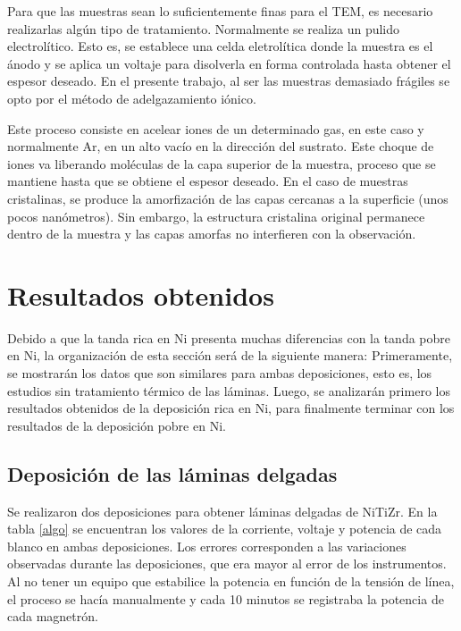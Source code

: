 \documentclass{article}
\theoremstyle{definition}
\theoremstyle{remark}
\begin{document}
Para que las muestras sean lo suficientemente finas para el TEM, es necesario realizarlas algún tipo de tratamiento. Normalmente se realiza un pulido electrolítico. Esto es, se establece una celda eletrolítica donde la muestra es el ánodo y se aplica un voltaje para disolverla en forma controlada hasta obtener el espesor deseado. En el presente trabajo, al ser las muestras demasiado frágiles se opto por el método de adelgazamiento iónico. 

Este proceso consiste en acelear iones de un determinado gas, en este caso y normalmente Ar, en un alto vacío en la dirección del sustrato. Este choque de iones va liberando moléculas de la capa superior de la muestra, proceso que se mantiene hasta que se obtiene el espesor deseado. En el caso de muestras cristalinas, se produce la amorfización de las capas cercanas a la superficie (unos pocos nanómetros). Sin embargo, la estructura cristalina original permanece dentro de la muestra y las capas amorfas no interfieren con la observación.


\section{Resultados obtenidos}
Debido a que la tanda rica en Ni presenta muchas diferencias con la tanda pobre en Ni, la organización de esta sección será de la siguiente manera: Primeramente, se mostrarán los datos que son similares para ambas deposiciones, esto es, los estudios sin tratamiento térmico de las láminas. Luego, se analizarán primero los resultados obtenidos de la deposición rica en Ni, para finalmente terminar con los resultados de la deposición pobre en Ni.
\subsection{Deposición de las láminas delgadas}
Se realizaron dos deposiciones para obtener láminas delgadas de NiTiZr. En la tabla \ref{algo} se encuentran los valores de la corriente, voltaje y potencia de cada blanco en ambas deposiciones. Los errores corresponden a las variaciones observadas durante las deposiciones, que era mayor al error de los instrumentos. Al no tener un equipo que estabilice la potencia en función de la tensión de línea, el proceso se hacía manualmente y cada 10 minutos se registraba la potencia de cada magnetrón.
\end{document}
